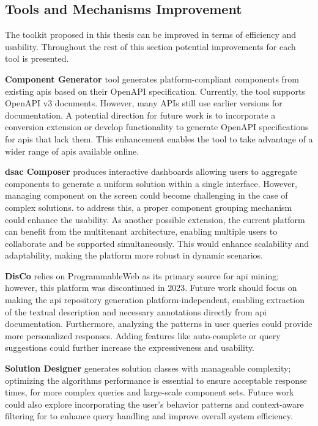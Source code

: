 \hypertarget{tools-improvements}{%
\subsection{Tools and Mechanisms Improvement}\label{tools-improvements}}
\vspace{10pt}

The toolkit proposed in this thesis can be improved in terms of efficiency and usability. Throughout the rest of this section potential improvements for each tool is presented.

\textbf{Component Generator} tool generates platform-compliant
components from existing \gls{api}s based on their OpenAPI specification.
Currently, the tool supports OpenAPI v3 documents. However, many APIs
still use earlier versions for documentation. A potential direction for
future work is to incorporate a conversion extension or develop
functionality to generate OpenAPI specifications for \gls{api}s that lack
them. This enhancement enables the tool to take advantage of a wider
range of \gls{api}s available online.

\textbf{\gls{dsac} Composer} produces interactive dashboards allowing users to
aggregate components to generate a uniform solution within a single
interface. However, managing component on the screen could become
challenging in the case of complex solutions. to address this, a proper
component grouping mechanism could enhance the usability. As another
possible extension, the current platform can benefit from the
multitenant architecture, enabling multiple users to collaborate and be
supported simultaneously. This would enhance scalability and
adaptability, making the platform more robust in dynamic scenarios.

\textbf{DisCo} relies on ProgrammableWeb as its primary source for \gls{api}
mining; however, this platform was discontinued in 2023. Future work
should focus on making the \gls{api} repository generation
platform-independent, enabling extraction of the textual description and
necessary annotations directly from \gls{api} documentation. Furthermore,
analyzing the patterns in user queries could provide more personalized
responses. Adding features like auto-complete or query suggestions could
further increase the expressiveness and usability.

\textbf{Solution Designer} generates solution classes with manageable
complexity; optimizing the algorithm\textquotesingle s performance is
essential to ensure acceptable response times, for more complex queries
and large-scale component sets. Future work could also explore
incorporating the user's behavior patterns and context-aware filtering
for to enhance query handling and improve overall system efficiency.

